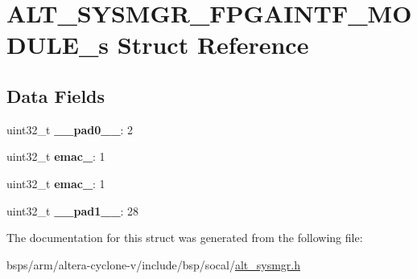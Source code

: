 \hypertarget{structALT__SYSMGR__FPGAINTF__MODULE__s}{}\section{A\+L\+T\+\_\+\+S\+Y\+S\+M\+G\+R\+\_\+\+F\+P\+G\+A\+I\+N\+T\+F\+\_\+\+M\+O\+D\+U\+L\+E\+\_\+s Struct Reference}
\label{structALT__SYSMGR__FPGAINTF__MODULE__s}
\subsection*{Data Fields}
\begin{DoxyCompactItemize}
\item 
\mbox{\label{structALT__SYSMGR__FPGAINTF__MODULE__s_a21b67c1e0ecd3df849731aa7ab00791b}} 
uint32\+\_\+t {\bfseries \+\_\+\+\_\+pad0\+\_\+\+\_\+}\+: 2
\item 
\mbox{\label{structALT__SYSMGR__FPGAINTF__MODULE__s_a49e3be0a97458380321266f77719d00f}} 
uint32\+\_\+t {\bfseries emac\+\_}\+: 1
\item 
\mbox{\label{structALT__SYSMGR__FPGAINTF__MODULE__s_a99e49597829509ee5f3f025b93bea2d3}} 
uint32\+\_\+t {\bfseries emac\+\_}\+: 1
\item 
\mbox{\label{structALT__SYSMGR__FPGAINTF__MODULE__s_a76f10e1f49be635db763c7b160c5ada3}} 
uint32\+\_\+t {\bfseries \+\_\+\+\_\+pad1\+\_\+\+\_\+}\+: 28
\end{DoxyCompactItemize}


The documentation for this struct was generated from the following file\+:\begin{DoxyCompactItemize}
\item 
bsps/arm/altera-\/cyclone-\/v/include/bsp/socal/\mbox{\hyperlink{alt__sysmgr_8h}{alt\+\_\+sysmgr.\+h}}\end{DoxyCompactItemize}
